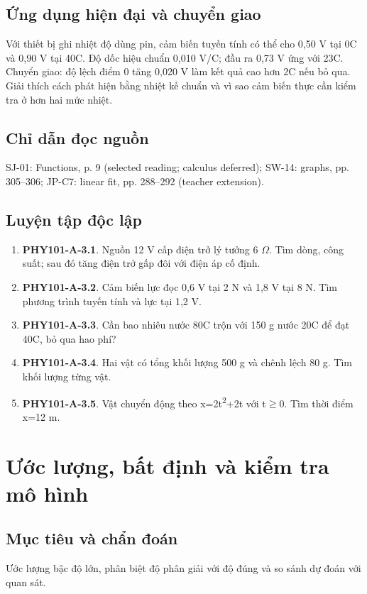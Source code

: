 \documentclass[11pt,a4paper,openany]{book}
\begin{document}
\section{Ứng dụng hiện đại và chuyển giao}
Với thiết bị ghi nhiệt độ dùng pin, cảm biến tuyến tính có thể cho 0,50 V tại 0\textdegree{}C và 0,90 V tại 40\textdegree{}C. Độ dốc hiệu chuẩn 0,010 V/\textdegree{}C; đầu ra 0,73 V ứng với 23\textdegree{}C. Chuyển giao: độ lệch điểm 0 tăng 0,020 V làm kết quả cao hơn 2\textdegree{}C nếu bỏ qua. Giải thích cách phát hiện bằng nhiệt kế chuẩn và vì sao cảm biến thực cần kiểm tra ở hơn hai mức nhiệt.
\section{Chỉ dẫn đọc nguồn}
SJ-01: Functions, p. 9 (selected reading; calculus deferred); SW-14: graphs, pp. 305–306; JP-C7: linear fit, pp. 288–292 (teacher extension).
\section{Luyện tập độc lập}
\begin{enumerate}
\item \textbf{PHY101-A-3.1}. Nguồn 12 V cấp điện trở lý tưởng 6 \ensuremath{\Omega}. Tìm dòng, công suất; sau đó tăng điện trở gấp đôi với điện áp cố định.
\item \textbf{PHY101-A-3.2}. Cảm biến lực đọc 0,6 V tại 2 N và 1,8 V tại 8 N. Tìm phương trình tuyến tính và lực tại 1,2 V.
\item \textbf{PHY101-A-3.3}. Cần bao nhiêu nước 80\textdegree{}C trộn với 150 g nước 20\textdegree{}C để đạt 40\textdegree{}C, bỏ qua hao phí?
\item \textbf{PHY101-A-3.4}. Hai vật có tổng khối lượng 500 g và chênh lệch 80 g. Tìm khối lượng từng vật.
\item \textbf{PHY101-A-3.5}. Vật chuyển động theo x=2t\textsuperscript{2}+2t với t\ensuremath{\ge}0. Tìm thời điểm x=12 m.
\end{enumerate}
\chapter{Ước lượng, bất định và kiểm tra mô hình}
\section{Mục tiêu và chẩn đoán}
Ước lượng bậc độ lớn, phân biệt độ phân giải với độ đúng và so sánh dự đoán với quan sát.
\end{document}

